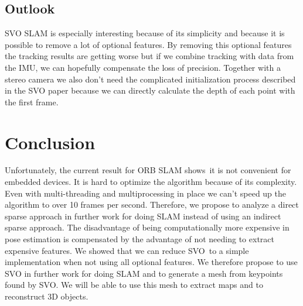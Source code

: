 \documentclass[11pt,a4paper,titlepage,oneside]{report}
\begin{document}
\section{Outlook}
SVO SLAM is especially interesting because of its simplicity and because it is possible to remove a lot of optional features. By removing this optional features the tracking results are getting worse but if we combine tracking with data from the IMU, we can hopefully compensate the loss of precision. Together with a stereo camera we also don’t need the complicated initialization process described in the SVO paper because we can directly calculate the depth of each point with the first frame.

\chapter{Conclusion}
Unfortunately, the current result for ORB SLAM shows it is not convenient for embedded devices. It is hard to optimize the algorithm because of its complexity. Even with multi-threading and multiprocessing in place we can’t speed up the algorithm to over 10 frames per second. Therefore, we propose to analyze a direct sparse approach in further work for doing SLAM instead of using an indirect sparse approach. The disadvantage of being computationally more expensive in pose estimation is compensated by the advantage of not needing to extract expensive features. We showed that we can reduce SVO to a simple implementation when not using all optional features. We therefore propose to use SVO in further work for doing SLAM and to generate a mesh from keypoints found by SVO. We will be able to use this mesh to extract maps and to reconstruct 3D objects.

\listoffigures
 
\end{document}
